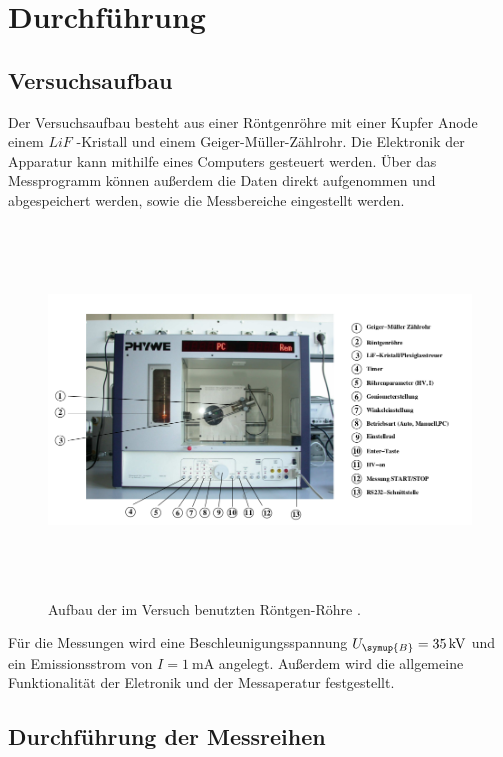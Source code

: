\newpage
\section{Durchführung}
\label{sec:Durchführung}

\subsection{Versuchsaufbau}
\label{subsec:Versuchsaufbau}

Der Versuchsaufbau besteht aus einer Röntgenröhre mit einer Kupfer Anode einem
$LiF$ -Kristall und einem Geiger-Müller-Zählrohr. Die Elektronik der Apparatur kann
mithilfe eines Computers gesteuert werden. Über das Messprogramm können außerdem die
Daten direkt aufgenommen und abgespeichert werden, sowie die Messbereiche eingestellt
werden.
\begin{figure}[H]
  \centering
  \includegraphics[width=16.6cm,height=9.8cm]{Aufbau.png}
  \caption{Aufbau der im Versuch benutzten Röntgen-Röhre \cite{alpha}.}
  \label{fig:Aufbau}
\end{figure}
Für die Messungen wird eine Beschleunigungsspannung $U_\symup{B} = \SI{35}{\kilo\volt}$ und ein
Emissionsstrom von $I = \SI{1}{\milli\ampere}$ angelegt. Außerdem wird die allgemeine Funktionalität
der Eletronik und der Messaperatur festgestellt.\\

\subsection{Durchführung der Messreihen}
\label{subsec:Messreihen}

